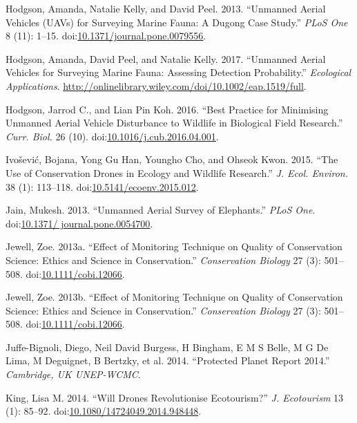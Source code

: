\documentclass[]{interact}
\theoremstyle{plain}%
\theoremstyle{definition}
\theoremstyle{remark}
\begin{document}
\hypertarget{ref-hodgson_unmanned_2013}{}
Hodgson, Amanda, Natalie Kelly, and David Peel. 2013. ``Unmanned Aerial
Vehicles (UAVs) for Surveying Marine Fauna: A Dugong Case Study.''
\emph{PLoS One} 8 (11): 1--15.
doi:\href{https://doi.org/10.1371/journal.pone.0079556}{10.1371/journal.pone.0079556}.

\hypertarget{ref-hodgson_unmanned_2017}{}
Hodgson, Amanda, David Peel, and Natalie Kelly. 2017. ``Unmanned Aerial
Vehicles for Surveying Marine Fauna: Assessing Detection Probability.''
\emph{Ecological Applications}.
\url{http://onlinelibrary.wiley.com/doi/10.1002/eap.1519/full}.

\hypertarget{ref-hodgson_best_2016}{}
Hodgson, Jarrod C., and Lian Pin Koh. 2016. ``Best Practice for
Minimising Unmanned Aerial Vehicle Disturbance to Wildlife in Biological
Field Research.'' \emph{Curr. Biol.} 26 (10).
doi:\href{https://doi.org/10.1016/j.cub.2016.04.001}{10.1016/j.cub.2016.04.001}.

\hypertarget{ref-ivosevic_use_2015}{}
Ivošević, Bojana, Yong Gu Han, Youngho Cho, and Ohseok Kwon. 2015. ``The
Use of Conservation Drones in Ecology and Wildlife Research.'' \emph{J.
Ecol. Environ.} 38 (1): 113--118.
doi:\href{https://doi.org/10.5141/ecoenv.2015.012}{10.5141/ecoenv.2015.012}.

\hypertarget{ref-jain_unmanned_2013}{}
Jain, Mukesh. 2013. ``Unmanned Aerial Survey of Elephants.'' \emph{PLoS
One}.
doi:\href{https://doi.org/10.1371/\%20journal.pone.0054700}{10.1371/ journal.pone.0054700}.

\hypertarget{ref-jewell_effect_2013-1}{}
Jewell, Zoe. 2013a. ``Effect of Monitoring Technique on Quality of
Conservation Science: Ethics and Science in Conservation.''
\emph{Conservation Biology} 27 (3): 501--508.
doi:\href{https://doi.org/10.1111/cobi.12066}{10.1111/cobi.12066}.

\hypertarget{ref-jewell_effect_2013}{}
Jewell, Zoe. 2013b. ``Effect of Monitoring Technique on Quality of
Conservation Science: Ethics and Science in Conservation.''
\emph{Conservation Biology} 27 (3): 501--508.
doi:\href{https://doi.org/10.1111/cobi.12066}{10.1111/cobi.12066}.

\hypertarget{ref-juffe-bignoli_protected_2014}{}
Juffe-Bignoli, Diego, Neil David Burgess, H Bingham, E M S Belle, M G De
Lima, M Deguignet, B Bertzky, et al. 2014. ``Protected Planet Report
2014.'' \emph{Cambridge, UK UNEP-WCMC}.

\hypertarget{ref-king_will_2014}{}
King, Lisa M. 2014. ``Will Drones Revolutionise Ecotourism?'' \emph{J.
Ecotourism} 13 (1): 85--92.
doi:\href{https://doi.org/10.1080/14724049.2014.948448}{10.1080/14724049.2014.948448}.
\end{document}

